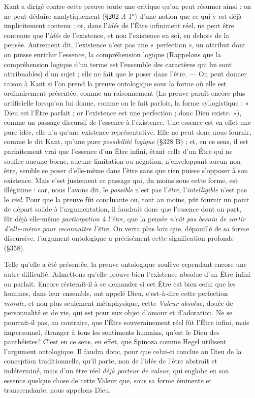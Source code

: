 {Kant a dirigé contre cette preuve toute une critique qu’on peut résumer
ainsi : on ne peut déduire analytiquement (\S 202 {\it A} 1°) d’une notion
que ce qui y est déjà implicitement contenu ; or, dans l’{\it idée} de l’Être
infiniment réel, ne peut être contenue que l’{\it idée} de l’existence, et non
l'existence en soi, en dehors de la pensée. Autrement dit, l'existence n’est
pas une « perfection », un attribut dont on puisse enrichir l'essence, la
compréhension logique
{\footnotesize (Rappelons que la compréhension logique d’un terme est l’ensemble des caractères
qui lui sont attribuables)}
d’un sujet ; elle ne fait que le poser dans l'être. —
On peut donner raison à Kant si l’on prend la preuve ontologique sous la
forme où elle est ordinairement présentée, comme un raisonnement
{\footnotesize (La preuve paraît encore plus artificielle lorsqu'on lui donne, comme on le fait
parfois, la forme syllogistique : « Dieu est l’Être parfait ; or l'existence est une perfection ;
donc Dieu existe. »)},
comme un passage discursif de l'essence à l'existence. Une essence est en
effet une pure idée, elle n’a qu’une existence représentative. Elle ne peut
donc nous fournir, comme le dit Kant, qu’une pure {\it possibilité logique}
(\S 328 B) ; et, en ce sens, il est parfaitement vrai que l’essence d’un Être
infini, étant celle d’un Étre qui ne souffre aucune borne, aucune limitation
ou négation, n’enveloppant aucun non-être, semble se poser d'elle-même dans
l’être sans que rien puisse s'opposer à son existence. Mais c’est justement ce
passage qui, du moins sous cette forme, est illégitime : car, nous l’avons dit,
le {\it possible} n’est pas l'{\it être}, l’{\it intelligible} n’est pas le {\it réel}. Pour que la preuve
fût concluante ou, tout au moins, pût fournir un point de départ solide à
l'argumentation, il faudrait donc que l'essence dont on part, fût déjà elle-même
{\it participation à l'être}, que la pensée {\it n’eût pas besoin de sortir d’elle-même
pour reconnaître l'être}. On verra plus loin que, dépouillé de sa forme
discursive, l’argument ontologique a précisément cette signification profonde (\S 358).

Telle qu’elle a été présentée, la preuve ontologique soulève cependant
encore une autre difficulté. Admettons qu'elle prouve bien l'existence
absolue d’un Être infini ou parfait. Encore résterait-il à se demander si cet
Être est bien celui que les hommes, dans leur ensemble, ont appelé Dieu,
c’est-à-dire cette perfection {\it morale}, et non plus seulement métaphysique,
cette {\it Valeur absolue}, douée de personnalité et de vie, qui est pour eux
objet d'amour et d’adoration. Ne se pourrait-il pas, au contraire, que l’Être
souverainement réel fût l’Être infini, mais impersonnel, étranger à tous les
sentiments humains, qu'est le Dieu des panthéistes? C’est en ce sens, en
effet, que Spinoza comme Hegel utilisent l'argument ontologique. Il faudra
donc, pour que celui-ci conclue au Dieu de la conception traditionnelle,
qu'il parte, non de l’idée de l’être abstrait et indéterminé, mais d’un être
réel {\it déjà porteur de valeur}, qui englobe en son essence quelque chose de cette
Valeur que, sous sa forme éminente et transcendante, nous appelons Dieu.

}
